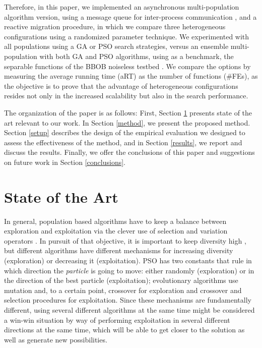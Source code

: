 Therefore, in this paper, we implemented an asynchronous multi-population
algorithm version, using a message queue for inter-process communication \cite{
guervos2018introducing}, and a reactive migration procedure, in which we compare
three heterogeneous configurations using a randomized parameter technique. We
experimented with all populations using a GA or PSO search strategies, versus an
ensemble multi-population with both GA and PSO algorithms, using as a benchmark,
the separable functions of the BBOB noiseless testbed \cite{hansen2009real}. 
We compare the options by
measuring the average running time (aRT) as the number of functions (\#FEs), as
the objective is to prove that the advantage of heterogeneous configurations
resides not only in the increased scalability but also in the search
performance. 

The organization of the paper is as follows: First, Section \ref{soa} presents
state of the art relevant to our work. In Section \ref{method}, we present the
proposed method.  Section \ref{setup} describes the design of the empirical
evaluation we designed to assess the effectiveness of the method, and in Section
\ref{results}, we report and discuss the results. Finally, we offer the
conclusions of this paper and suggestions on future work in Section
\ref{conclusions}.


\section{State of the Art}
\label{soa}

In general, population based algorithms have to keep a balance between
exploration and exploitation via the clever use of selection and
variation operators \cite{vcrepinvsek2013exploration}. In pursuit of
that objective, it is important to keep diversity high
\cite{yuan2005importance}, but different algorithms have different
mechanisms for increasing diversity (exploration) or decreasing it
(exploitation). PSO has two constants that rule in which direction the
{\em particle} is going to move: either randomly (exploration) or in
the direction of the best particle (exploitation); evolutionary
algorithms use mutation and, to a certain point, crossover for
exploration and crossover and selection procedures for
exploitation. Since these mechanisms are fundamentally different,
using several different algorithms at the same time might be
considered a win-win situation by way of performing exploitation in
several different directions at the same time, which will be able to
get closer to the solution as well as generate new possibilities.

